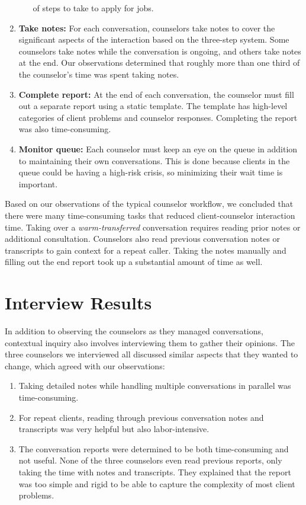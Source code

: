 \begin{enumerate}
\begin{enumerate}
    of steps to take to apply for jobs.
  \end{enumerate}
  \item \textbf{Take notes:} For each conversation, counselors take notes to cover the
  significant aspects of the interaction based on the three-step system. Some counselors
  take notes while the conversation is ongoing, and others take notes at the end.
  Our observations determined that roughly more than one third of the counselor's
  time was spent taking notes.
  \item \textbf{Complete report:} At the end of each conversation, the counselor must fill
  out a separate report using a static template. The template has high-level
  categories of client problems and counselor responses. Completing the report
  was also time-consuming.
  \item \textbf{Monitor queue:} Each counselor must keep an eye on the queue in addition to
  maintaining their own conversations. This is done because clients in the queue
  could be having a high-risk crisis, so minimizing their wait time is important.
\end{enumerate}

Based on our observations of the typical counselor workflow, we concluded that
there were many time-consuming tasks that reduced client-counselor interaction time.
Taking over a \textit{warm-transferred} conversation requires reading prior notes or additional consultation. Counselors also read previous conversation notes or transcripts to gain
context for a repeat caller. Taking the notes manually and filling out the end report
took up a substantial amount of time as well.

\section{Interview Results}

In addition to observing the counselors as they managed conversations, contextual
inquiry also involves interviewing them to gather their opinions. The three counselors
we interviewed all discussed similar aspects that they wanted to change, which agreed
with our observations:

\begin{enumerate}
  \item Taking detailed notes while handling multiple conversations in parallel was
  time-consuming.
  \item For repeat clients, reading through previous conversation notes and transcripts
  was very helpful but also labor-intensive.
  \item The conversation reports were determined to be both time-consuming and not
  useful. None of the three counselors even read previous reports, only taking the
  time with notes and transcripts. They explained that the report was too simple
  and rigid to be able to capture the complexity of most client problems.
\end{enumerate}

